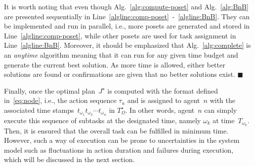 \begin{remark}\label{remark:parallel}
It is worth noting that even though Alg.~\ref{alg:compute-poset} and
Alg.~\ref{alg:BnB} are presented sequentially in
Line~\ref{algline:comp-poset}~-~\ref{algline:BnB}.
They can be implemented and run {in parallel}, i.e., more posets are
generated and stored in Line~\ref{algline:comp-poset},
while other posets are used for task assignment in Line~\ref{algline:BnB}.
Moreover, it should be emphasized that Alg.~\ref{alg:complete} is an \emph{anytime}
algorithm meaning that it can run for any given time budget and generate the
current best solution.
As more time is allowed, either better solutions are found or confirmations are
given that no better solutions exist.
\hfill  $\blacksquare$
\end{remark}




Finally, once the optimal plan~$J^\star$ is computed with the format
defined in~\eqref{eq:node}, i.e.,
the action sequence $\tau_n$ and is assigned
to agent~$n$ with the associated time stamps~$t_{\omega_1}t_{\omega_2}\cdots t_{\omega_n}$ in $T^\star_\Omega$.
In other words,
agent~$n$ can simply execute this sequence of subtasks at the designated time,
namely $\omega_k$ at time~$T_{\omega_k}$.
Then, it is ensured that the overall task can be fulfilled in minimum time.
However, such a way of execution can be prone to uncertainties in the system
model such as fluctuations in action duration
and failures during execution, which will be discussed in the next section.

